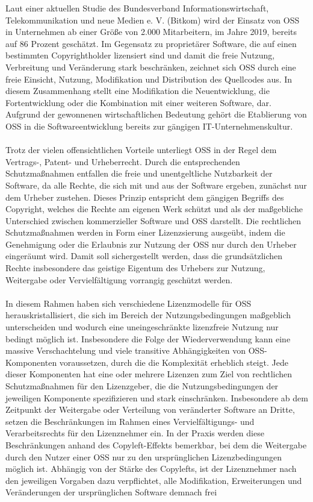 Laut einer aktuellen Studie des Bundesverband Informationswirtschaft, Telekommunikation und neue Medien e. V. (Bitkom) wird der Einsatz von OSS in Unternehmen ab einer Größe von 2.000 Mitarbeitern, im Jahre 2019, bereits auf 86 Prozent geschätzt. \cite{bitkom_open_2020} Im Gegensatz zu proprietärer Software, die auf einen bestimmten Copyrightholder lizensiert sind und damit die freie Nutzung, Verbreitung und Veränderung stark beschränken, zeichnet sich OSS durch eine freie Einsicht, Nutzung, Modifikation und Distribution des Quellcodes aus. In diesem Zusammenhang stellt eine Modifikation die Neuentwicklung, die Fortentwicklung oder die Kombination mit einer weiteren Software, dar. Aufgrund der gewonnenen wirtschaftlichen Bedeutung gehört die Etablierung von OSS in die Softwareentwicklung bereits zur gängigen IT-Unternehmenskultur. \cite[S. 21,22]{allmann_open_2019}\\\\ Trotz der vielen offensichtlichen Vorteile unterliegt OSS in der Regel dem Vertrags-, Patent- und Urheberrecht. \cite[S. 28 ff.]{kesler_anpassung_2013} Durch die entsprechenden Schutzmaßnahmen entfallen die freie und unentgeltliche Nutzbarkeit der Software, da alle Rechte, die sich mit und aus der Software ergeben, zunächst nur dem Urheber zustehen. Dieses Prinzip entspricht dem gängigen Begriffs des Copyright, welches die Rechte am eigenen Werk schützt und als der maßgebliche Unterschied zwischen kommerzieller Software und OSS darstellt. Die rechtlichen Schutzmaßnahmen werden in Form einer Lizenzsierung ausgeübt, indem die Genehmigung oder die Erlaubnis zur Nutzung der OSS nur durch den Urheber eingeräumt wird. \cite{wilmer_rechtliche_2021} Damit soll sichergestellt werden, dass die grundsätzlichen Rechte insbesondere das geistige Eigentum des Urhebers zur Nutzung, Weitergabe oder Vervielfältigung vorrangig geschützt werden.\\\\ In diesem Rahmen haben sich verschiedene Lizenzmodelle für OSS herauskristallisiert, die sich im Bereich der Nutzungsbedingungen maßgeblich unterscheiden und wodurch eine uneingeschränkte lizenzfreie Nutzung nur bedingt möglich ist. \cite{wilmer_rechtliche_2021} Insbesondere die Folge der Wiederverwendung kann eine massive Verschachtelung und viele transitive Abhängigkeiten von OSS-Komponenten voraussetzen, durch die die Komplexität erheblich steigt. Jede dieser Komponenten hat eine oder mehrere Lizenzen zum Ziel von rechtlichen Schutzmaßnahmen für den Lizenzgeber, die die Nutzungsbedingungen der jeweiligen Komponente spezifizieren und stark einschränken. Insbesondere ab dem Zeitpunkt der Weitergabe oder Verteilung von veränderter Software an Dritte, setzen die Beschränkungen im Rahmen eines Vervielfältigungs- und Verarbeitsrechts für den Lizenznehmer ein. In der Praxis werden diese Beschränkungen anhand des Copyleft-Effekts bemerkbar, bei dem die Weitergabe durch den Nutzer einer OSS nur zu den ursprünglichen Lizenzbedingungen möglich ist. \cite[S. 184]{sujecki_vertrags-_2005} Abhängig von der Stärke des Copylefts, ist der Lizenznehmer nach den jeweiligen Vorgaben dazu verpflichtet, alle Modifikation, Erweiterungen und Veränderungen der ursprünglichen Software demnach frei 